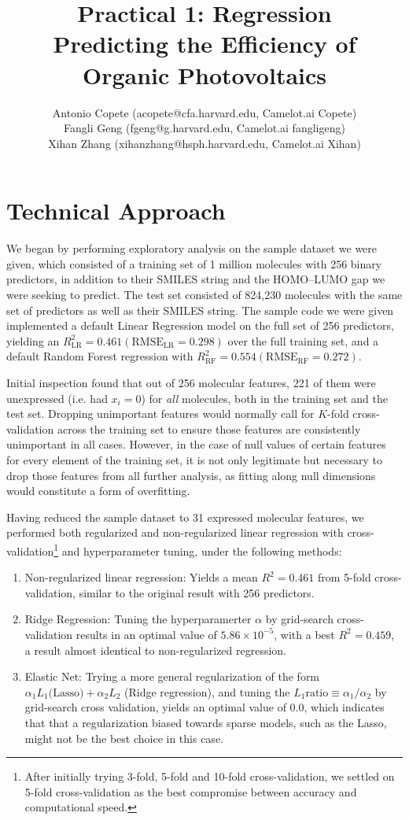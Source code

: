 \documentclass[11pt]{article}
\title{Practical 1: Regression \\ Predicting the Efficiency of Organic Photovoltaics}
\author{Antonio Copete (acopete@cfa.harvard.edu, Camelot.ai Copete) \\
	Fangli Geng (fgeng@g.harvard.edu, Camelot.ai fangligeng) \\
	Xihan Zhang (xihanzhang@hsph.harvard.edu, Camelot.ai Xihan)}
\begin{document}
\maketitle{}


\section{Technical Approach}

We began by performing exploratory analysis on the sample dataset we were given, which consisted of a training set of 1 million molecules with 256 binary predictors, in addition to their SMILES string and the HOMO--LUMO gap we were seeking to predict. The test set consisted of 824,230 molecules with the same set of predictors as well as their SMILES string. The sample code we were given implemented a default Linear Regression model on the full set of 256 predictors, yielding an $R_\textrm{LR}^2 = 0.461 (\textrm{RMSE}_\textrm{LR} = 0.298)$ over the full training set, and a default Random Forest regression with $R_\textrm{RF}^2 = 0.554 (\textrm{RMSE}_\textrm{RF} = 0.272)$.

Initial inspection found that out of 256 molecular features, 221 of them were unexpressed (i.e. had $x_i = 0$) for \emph{all} molecules, both in the training set and the test set. Dropping unimportant features would normally call for $K$-fold cross-validation across the training set to ensure those features are consistently unimportant in all cases. However, in the case of null values of certain features for every element of the training set, it is not only legitimate but necessary to drop those features from all further analysis, as fitting along null dimensions would constitute a form of overfitting.

Having reduced the sample dataset to 31 expressed molecular features, we performed both regularized and non-regularized linear regression with cross-validation\footnote{After initially trying 3-fold, 5-fold and 10-fold cross-validation, we settled on 5-fold cross-validation as the best compromise between accuracy and computational speed.} and hyperparameter tuning, under the following methods:

\begin{enumerate}

\item Non-regularized linear regression: Yields a mean $R^2 = 0.461$ from 5-fold cross-validation, similar to the original result with 256 predictors.
\item Ridge Regression: Tuning the hyperparamerter $\alpha$ by grid-search cross-validation results in an optimal value of $5.86 \times 10^{-5}$, with a best $R^2 = 0.459$, a result almost identical to non-regularized regression. 
\item Elastic Net: Trying a more general regularization of the form $\alpha_1 L_1 \textrm{(Lasso)} + \alpha_2 L_2$ (Ridge regression), and tuning the $L_1 \textrm{ratio} \equiv \alpha_1/\alpha_2$ by grid-search cross validation, yields an optimal value of 0.0, which indicates that that a regularization biased towards sparse models, such as the Lasso, might not be the best choice in this case.

\end{enumerate}
\end{document}
